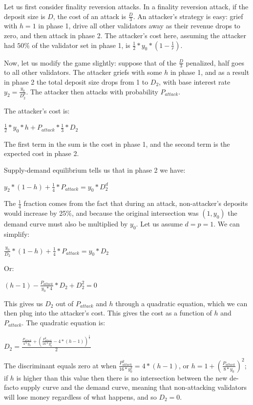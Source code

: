 \documentclass[12pt]{article}
\begin{document}
Let us first consider finality reversion attacks. In a finality reversion attack, if the deposit size is $D$, the cost of an attack is $\frac{D}{3}$. An attacker's strategy is easy: grief with $h = 1$ in phase 1, drive all other validators away as their revenue drops to zero, and then attack in phase 2. The attacker's cost here, assuming the attacker had $50\%$ of the validator set in phase 1, is $\frac{1}{2} * y_0 * (1 - \frac{1}{r})$.

Now, let us modify the game slightly: suppose that of the $\frac{D}{3}$ penalized, half goes to all other validators. The attacker griefs with some $h$ in phase 1, and as a result in phase 2 the total deposit size drops from 1 to $D_2$, with base interest rate $y_2 = \frac{y_0}{D_2^p}$. The attacker then attacks with probability $P_{attack}$.

The attacker's cost is:

$\frac{1}{2} * y_0 * h + P_{attack} * \frac{1}{3} * D_2$

The first term in the sum is the cost in phase 1, and the second term is the expected cost in phase 2.

Supply-demand equilibrium tells us that in phase 2 we have:

$y_2 * (1-h) + \frac{1}{4} * P_{attack} = y_0 * D_2^d$

The $\frac{1}{4}$ fraction comes from the fact that during an attack, non-attacker's deposits would increase by 25\%, and because the original intersection was $(1, y_0)$ the demand curve must also be multiplied by $y_0$. Let us assume $d = p = 1$. We can simplify:

$\frac{y_0}{D_2} * (1-h) + \frac{1}{4} * P_{attack} = y_0 * D_2$

Or:

$(h-1) - \frac{P_{attack}}{y_0 * 4} * D_2 + D_2^2 = 0$

This gives us $D_2$ out of $P_{attack}$ and $h$ through a quadratic equation, which we can then plug into the attacker's cost. This gives the cost as a function of $h$ and $P_{attack}$. The quadratic equation is:

$D_2 = \frac{\frac{P_{attack}}{4 * y_0} + (\frac{P_{attack}^2}{16 * y_0^2} - 4 * (h-1))^{\frac{1}{2}}}{2}$

The discriminant equals zero at when $\frac{P_{attack}^2}{16 * y_0^2} = 4 * (h-1)$, or $h = 1 + (\frac{P_{attack}}{8 * y_0})^2$; if $h$ is higher than this value then there is no intersection between the new de-facto supply curve and the demand curve, meaning that non-attacking validators will lose money regardless of what happens, and so $D_2 = 0$.
\end{document}
